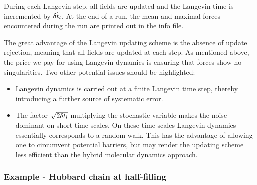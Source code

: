  During each Langevin step, all fields are updated and the Langevin time is incremented by $ \tilde{\delta t_{l}}$.  At the end of a run, the mean and maximal forces encountered during the run are printed out in the info file.

The great advantage of the Langevin updating scheme is the absence of update rejection, meaning that all fields are updated at each step. As mentioned above, the price we pay for using Langevin dynamics is ensuring that forces show no singularities. Two other potential issues should be highlighted:
\begin{itemize}
\item   Langevin dynamics is carried out at a finite Langevin time step, thereby introducing a further source of systematic error.
\item   The factor $\sqrt{2 \delta t_{l}} $   multiplying the stochastic variable makes the  noise dominant  on short time scales.  On these time scales  Langevin dynamics essentially  corresponds to a random walk. This has the advantage of allowing one to circumvent potential barriers, but may render the updating scheme less efficient than the hybrid molecular dynamics approach.
\end{itemize}

\subsubsection*{Example - Hubbard chain at half-filling}


